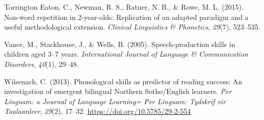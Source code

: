 \documentclass[english,,man,floatsintext]{apa6}
\begin{document}
\leavevmode\hypertarget{ref-torrington2015non}{}%
Torrington Eaton, C., Newman, R. S., Ratner, N. B., \& Rowe, M. L. (2015). Non-word repetition in 2-year-olds: Replication of an adapted paradigm and a useful methodological extension. \emph{Clinical Linguistics \& Phonetics}, \emph{29}(7), 523--535.

\leavevmode\hypertarget{ref-vance2005speech}{}%
Vance, M., Stackhouse, J., \& Wells, B. (2005). Speech-production skills in children aged 3--7 years. \emph{International Journal of Language \& Communication Disorders}, \emph{40}(1), 29--48.

\leavevmode\hypertarget{ref-wilsenach2013phonological}{}%
Wilsenach, C. (2013). Phonological skills as predictor of reading success: An investigation of emergent bilingual Northern Sotho/English learners. \emph{Per Linguam: a Journal of Language Learning= Per Linguam: Tydskrif vir Taalaanleer}, \emph{29}(2), 17--32. \url{https://doi.org/10.5785/29-2-554}
\end{document}
